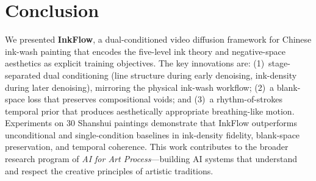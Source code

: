 \section{Conclusion}
\label{sec:conclusion}

We presented \textbf{InkFlow}, a dual-conditioned video diffusion
framework for Chinese ink-wash painting that encodes the
five-level ink theory and negative-space aesthetics as explicit
training objectives. The key innovations are: (1)~stage-separated
dual conditioning (line structure during early denoising,
ink-density during later denoising), mirroring the physical
ink-wash workflow; (2)~a blank-space loss that preserves
compositional voids; and (3)~a rhythm-of-strokes temporal prior
that produces aesthetically appropriate breathing-like motion.
Experiments on 30 Shanshui paintings demonstrate that InkFlow
outperforms unconditional and single-condition baselines in
ink-density fidelity, blank-space preservation, and temporal
coherence. This work contributes to the broader research program
of \emph{AI for Art Process}---building AI systems that understand
and respect the creative principles of artistic traditions.
